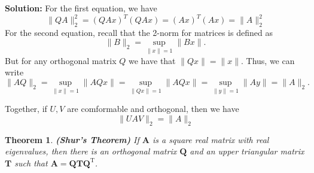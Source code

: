 \documentclass[14pt]{article}
\newtheorem{theorem}{Theorem}[section]
\theoremstyle{definition}
\newenvironment{solution}
{\color{C2}\begin{framed}\begingroup\textbf{Solution:} }
  {\endgroup\end{framed}}
\theoremstyle{remark}
\begin{document}
\begin{solution}
    For the first equation, we have
    $$
        \|Q A\|_2^2=(Q A x)^T(Q A x)=(A x)^T(A x)=\|A\|_2^2
    $$
    For the second equation, recall that the 2-norm for matrices is defined as
    $$
        \|B\|_2=\sup _{\|x\|=1}\|B x\| .
    $$
    But for any orthogonal matrix $Q$ we have that $\|Q x\|=\|x\|$. Thus, we can write
    $$
        \|A Q\|_2=\sup _{\|x\|=1}\|A Q x\|=\sup _{\|Q x\|=1}\|A Q x\|=\sup _{\|y\|=1}\|A y\|=\|A\|_2 .
    $$

    Together, if $U, V$ are comformable and orthogonal, then we have
    $$
        \|UAV\|_2 = \|A\|_2
    $$
\end{solution}

\begin{theorem}
    \textbf{(Shur's Theorem)}  If $\boldsymbol{A}$ is a square real matrix with real eigenvalues, then there is an orthogonal matrix $\boldsymbol{Q}$ and an upper triangular matrix $\boldsymbol{T}$ such that $\boldsymbol{A}=\boldsymbol{Q} \boldsymbol{T} \boldsymbol{Q}^{\mathrm{T}}$.

\end{theorem}
\end{document}
